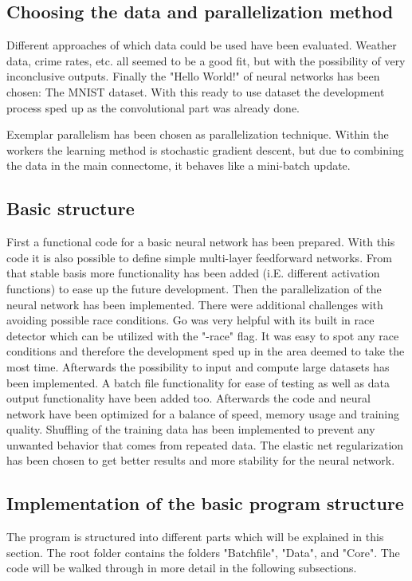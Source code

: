 \documentclass[11pt]{article}
\begin{document}
\subsection{Choosing the data and parallelization method}
Different approaches of which data could be used have been evaluated. Weather data, crime rates, etc. all seemed to be a good fit, but with the possibility of very inconclusive outputs. Finally the "Hello World!" of neural networks has been chosen: The MNIST dataset\cite{MNISTData}. With this ready to use dataset the development process sped up as the convolutional part was already done.

Exemplar parallelism\cite{Rogers1997StrategiesFP} has been chosen as parallelization technique. Within the workers the learning method is stochastic gradient descent\cite{bottou2010large}, but due to combining the data in the main connectome, it behaves like a mini-batch update\cite{NIPS2010_4006}.

\subsection{Basic structure}
First a functional code for a basic neural network has been prepared. With this code it is also possible to define simple multi-layer feedforward networks. From that stable basis more functionality has been added (i.E. different activation functions) to ease up the future development.
Then the parallelization of the neural network has been implemented. There were additional challenges with avoiding possible race conditions. Go was very helpful with its built in race detector which can be utilized with the "-race" flag. It was easy to spot any race conditions and therefore the development sped up in the area deemed to take the most time.
Afterwards the possibility to input and compute large datasets has been implemented. A batch file functionality for ease of testing as well as data output functionality have been added too.
Afterwards the code and neural network have been optimized for a balance of speed, memory usage and training quality. Shuffling of the training data has been implemented to prevent any unwanted behavior that comes from repeated data. The elastic net regularization\cite{zou2005regularization} has been chosen to get better results and more stability for the neural network.

\subsection{Implementation of the basic program structure}
The program is structured into different parts which will be explained in this section. The root folder contains the folders "Batchfile", "Data", and "Core". The code will be walked through in more detail in the following subsections.
\end{document}
